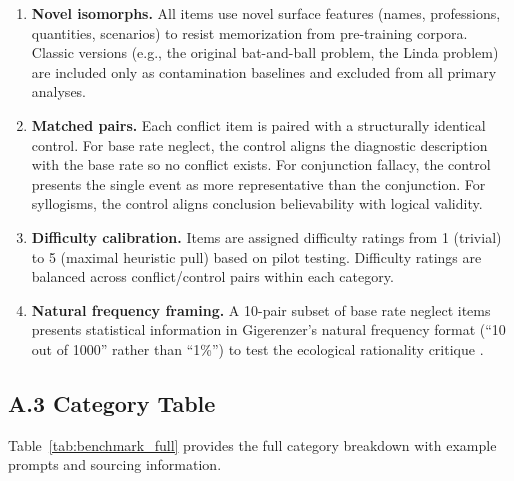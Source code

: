 \documentclass{article}
\begin{document}
\begin{enumerate}[leftmargin=*,itemsep=4pt]
  \item \textbf{Novel isomorphs.}  All items use novel surface features
  (names, professions, quantities, scenarios) to resist memorization
  from pre-training corpora.  Classic versions (e.g., the original
  bat-and-ball problem, the Linda problem) are included only as
  contamination baselines and excluded from all primary analyses.

  \item \textbf{Matched pairs.}  Each conflict item is paired with a
  structurally identical control.  For base rate neglect, the control
  aligns the diagnostic description with the base rate so no conflict
  exists.  For conjunction fallacy, the control presents the single
  event as more representative than the conjunction.  For syllogisms,
  the control aligns conclusion believability with logical validity.

  \item \textbf{Difficulty calibration.}  Items are assigned difficulty
  ratings from 1 (trivial) to 5 (maximal heuristic pull) based on pilot
  testing.  Difficulty ratings are balanced across conflict/control pairs
  within each category.

  \item \textbf{Natural frequency framing.}  A 10-pair subset of base
  rate neglect items presents statistical information in Gigerenzer's
  natural frequency format (``10 out of 1000'' rather than ``1\%'') to
  test the ecological rationality critique
  \citep{gigerenzer1995improve}.
\end{enumerate}

\subsection*{A.3 Category Table}

Table~\ref{tab:benchmark_full} provides the full category breakdown
with example prompts and sourcing information.
\end{document}
